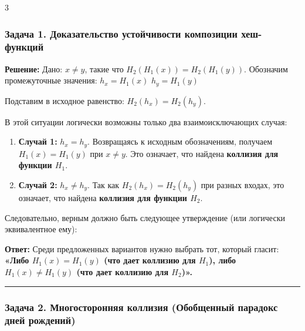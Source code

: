 ﻿\documentclass[9pt,a4paper,landscape]{extarticle}
\newcommand{\tightlist}{}
\begin{document}
\begin{multicols*}{3}
\subsubsection{Задача 1. Доказательство устойчивости композиции хеш-функций}\label{ux437ux430ux434ux430ux447ux430-1.-ux434ux43eux43aux430ux437ux430ux442ux435ux43bux44cux441ux442ux432ux43e-ux443ux441ux442ux43eux439ux447ux438ux432ux43eux441ux442ux438-ux43aux43eux43cux43fux43eux437ux438ux446ux438ux438-ux445ux435ux448-ux444ux443ux43dux43aux446ux438ux439}

\textbf{Решение:} Дано: \(x \neq y\), такие что \(H_2(H_1(x)) = H_2(H_1(y))\). Обозначим промежуточные значения: \(h_x = H_1(x)\) \(h_y = H_1(y)\)

Подставим в исходное равенство: \(H_2(h_x) = H_2(h_y)\).

В этой ситуации логически возможны только два взаимоисключающих случая:

\begin{enumerate}
\def\labelenumi{\arabic{enumi}.}
\tightlist
\item
  \textbf{Случай 1:} \(h_x = h_y\). Возвращаясь к исходным обозначениям, получаем \(H_1(x) = H_1(y)\) при \(x \neq y\). Это означает, что найдена \textbf{коллизия для функции \(H_1\)}.
\item
  \textbf{Случай 2:} \(h_x \neq h_y\). Так как \(H_2(h_x) = H_2(h_y)\) при разных входах, это означает, что найдена \textbf{коллизия для функции \(H_2\)}.
\end{enumerate}

Следовательно, верным должно быть следующее утверждение (или логически эквивалентное ему):

\textbf{Ответ:} Среди предложенных вариантов нужно выбрать тот, который гласит: \textbf{«Либо \(H_1(x) = H_1(y)\) (что дает коллизию для \(H_1\)), либо \(H_1(x) \neq H_1(y)\) (что дает коллизию для \(H_2\))».}

\begin{center}\rule{0.5\linewidth}{0.5pt}\end{center}

\subsubsection{Задача 2. Многосторонняя коллизия (Обобщенный парадокс дней рождений)}\label{ux437ux430ux434ux430ux447ux430-2.-ux43cux43dux43eux433ux43eux441ux442ux43eux440ux43eux43dux43dux44fux44f-ux43aux43eux43bux43bux438ux437ux438ux44f-ux43eux431ux43eux431ux449ux435ux43dux43dux44bux439-ux43fux430ux440ux430ux434ux43eux43aux441-ux434ux43dux435ux439-ux440ux43eux436ux434ux435ux43dux438ux439}


\end{multicols*}
\end{document}
